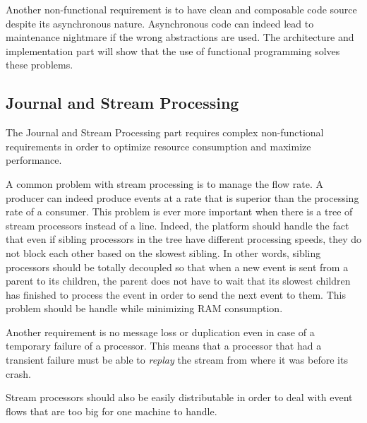 Another non-functional requirement is to have clean and composable code source despite its asynchronous nature. Asynchronous
code can indeed lead to maintenance nightmare if the wrong abstractions are used. The architecture and implementation part will
show that the use of functional programming solves these problems.

\subsection{Journal and Stream Processing}

The Journal and Stream Processing part requires complex non-functional requirements in order to optimize resource consumption and maximize performance.

A common problem with stream processing is to manage the flow rate. A producer can indeed produce events at a rate that is superior than
the processing rate of a consumer. This problem is ever more important when there is
a tree of stream processors instead of a line. Indeed, the platform should handle the fact that even if sibling processors in the tree
have different processing speeds, they do not block each other based on the slowest sibling. In other words, sibling processors should be
totally decoupled so that when a new event is sent from a parent to its children, the parent does not have to wait that its slowest
children has finished to process the event in order to send the next event to them. This problem should be handle while minimizing
RAM consumption.

Another requirement is no message loss or duplication even in case of a temporary failure of a processor. This means that a processor
that had a transient failure must be able to \textit{replay} the stream from where it was before its crash.

Stream processors should also be easily distributable in order to deal with event flows that are too big
for one machine to handle.



